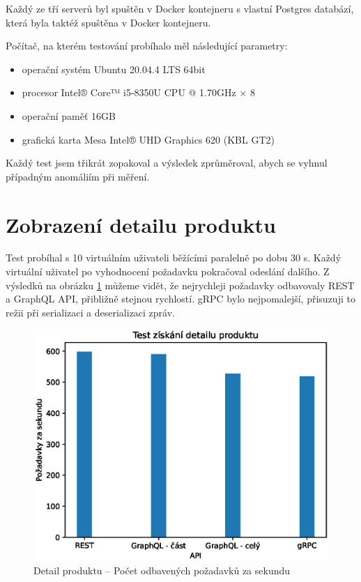 \documentclass[thesis=M,czech]{FITthesis}[2019/12/23]
\begin{document}
Každý ze tří serverů byl spuštěn v Docker kontejneru s vlastní Postgres databází, která byla taktéž spuštěna v Docker kontejneru.

Počítač, na kterém testování probíhalo měl následující parametry:

\begin{itemize}
  \item operační systém Ubuntu 20.04.4 LTS 64bit
  \item procesor Intel® Core™ i5-8350U CPU @ 1.70GHz $\times$  8 
  \item operační paměť 16GB
  \item grafická karta Mesa Intel® UHD Graphics 620 (KBL GT2)
\end{itemize}

Každý test jsem třikrát zopakoval a výsledek zprůměroval, abych se vyhnul případným anomáliím při měření.

\clearpage
\section{Zobrazení detailu produktu}
Test probíhal s 10 virtuálním uživateli běžícími paralelně po dobu 30 s. Každý virtuální uživatel po vyhodnocení požadavku pokračoval odeslání dalšího. Z výsledků na obrázku \ref{test_get_product} můžeme vidět, že nejrychleji požadavky odbavovaly REST a GraphQL API, přibližně stejnou rychlostí. gRPC bylo nejpomalejší, přisuzuji to režii při serializaci a deserializaci zpráv.

\begin{figure}[]
  \includegraphics[width=\linewidth]{img/get-product.eps}
  \caption{Detail produktu -- Počet odbavených požadavků za sekundu}
\label{test_get_product}
\end{figure}
\end{document}
